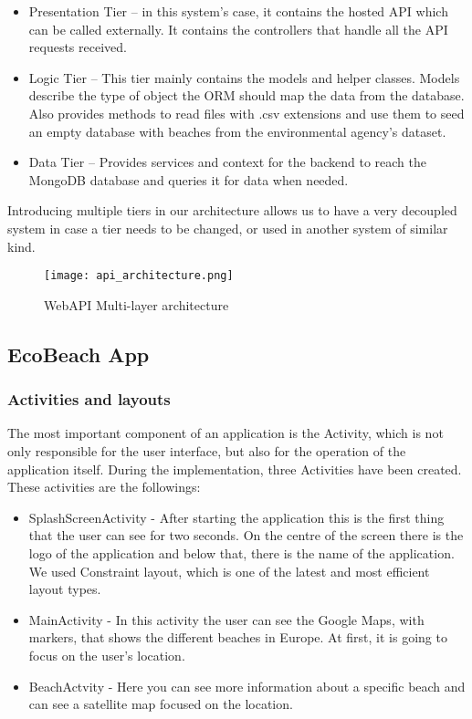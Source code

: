 \begin{itemize}
    \item Presentation Tier – in this system’s case, it contains the hosted API which can be called externally. It contains the controllers that handle all the API requests received.
    \item Logic Tier – This tier mainly contains the models and helper classes. Models describe the type of object the ORM should map the data from the database. Also provides methods to read files with .csv extensions and use them to seed an empty database with beaches from the environmental agency’s dataset.
    \item Data Tier – Provides services and context for the backend to reach the MongoDB database and queries it for data when needed. 
\end{itemize}

Introducing multiple tiers in our architecture allows us to have a very decoupled system in case a tier needs to be changed, or used in another system of similar kind. 

\begin{figure}[h!]
    \centering
    \texttt{[image: api\_architecture.png]}
    \caption{WebAPI Multi-layer architecture}
    \label{fig:api_architecture}
\end{figure}

\subsection{EcoBeach App}\label{subsec:ecobeach-app}

\subsubsection{Activities and layouts}

The most important component of an application is the Activity, which is not only responsible for the user interface, but also for the operation of the application itself. During the implementation, three Activities have been created. These activities are the followings:

\begin{itemize}
    \item SplashScreenActivity - After starting the application this is the first thing that the user can see for two seconds. On the centre of the screen there is the logo of the application and below that, there is the name of the application. We used Constraint layout, which is one of the latest and most efficient layout types.
    \item MainActivity - In this activity the user can see the Google Maps, with markers, that shows the different beaches in Europe. At first, it is going to focus on the user’s location.
    \item BeachActvity - Here you can see more information about a specific beach and can see a satellite map focused on the location.
\end{itemize}

